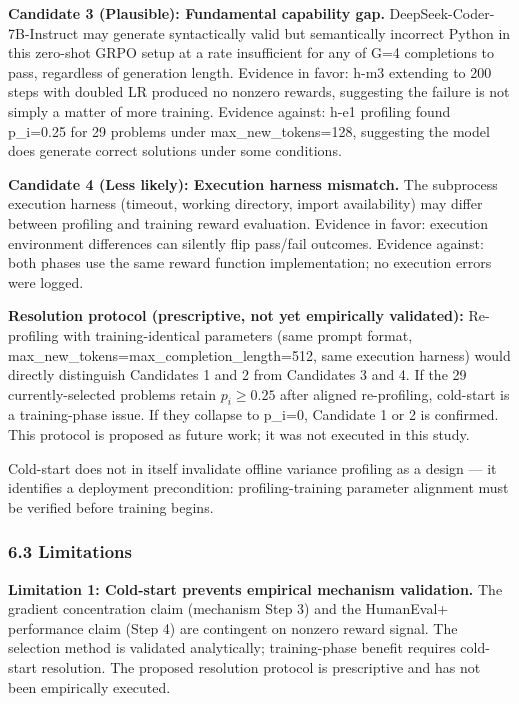 \textbf{Candidate 3 (Plausible): Fundamental capability gap.} DeepSeek-Coder-7B-Instruct may generate syntactically valid but semantically incorrect Python in this zero-shot GRPO setup at a rate insufficient for any of G=4 completions to pass, regardless of generation length. Evidence in favor: h-m3 extending to 200 steps with doubled LR produced no nonzero rewards, suggesting the failure is not simply a matter of more training. Evidence against: h-e1 profiling found p\_i=0.25 for 29 problems under max\_new\_tokens=128, suggesting the model does generate correct solutions under some conditions.

\textbf{Candidate 4 (Less likely): Execution harness mismatch.} The subprocess execution harness (timeout, working directory, import availability) may differ between profiling and training reward evaluation. Evidence in favor: execution environment differences can silently flip pass/fail outcomes. Evidence against: both phases use the same reward function implementation; no execution errors were logged.

\textbf{Resolution protocol (prescriptive, not yet empirically validated):} Re-profiling with training-identical parameters (same prompt format, max\_new\_tokens=max\_completion\_length=512, same execution harness) would directly distinguish Candidates 1 and 2 from Candidates 3 and 4. If the 29 currently-selected problems retain $p_i\geq 0.25$ after aligned re-profiling, cold-start is a training-phase issue. If they collapse to p\_i=0, Candidate 1 or 2 is confirmed. This protocol is proposed as future work; it was not executed in this study.

Cold-start does not in itself invalidate offline variance profiling as a design --- it identifies a deployment precondition: profiling-training parameter alignment must be verified before training begins.

\subsubsection{6.3 Limitations}

\textbf{Limitation 1: Cold-start prevents empirical mechanism validation.} The gradient concentration claim (mechanism Step 3) and the HumanEval+ performance claim (Step 4) are contingent on nonzero reward signal. The selection method is validated analytically; training-phase benefit requires cold-start resolution. The proposed resolution protocol is prescriptive and has not been empirically executed.

